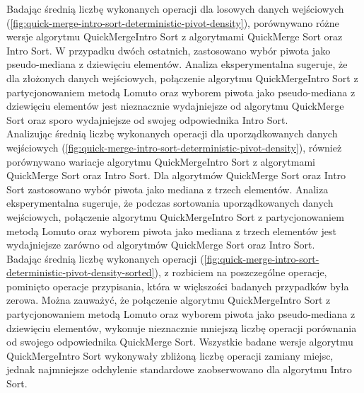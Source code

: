 Badając średnią liczbę wykonanych operacji dla losowych danych wejściowych (\ref{fig:quick-merge-intro-sort-deterministic-pivot-density}), porównywano różne wersje algorytmu QuickMergeIntro Sort z algorytmami QuickMerge Sort oraz Intro Sort. W przypadku dwóch ostatnich, zastosowano wybór piwota jako pseudo-mediana z dziewięciu elementów. Analiza eksperymentalna sugeruje, że dla złożonych danych wejściowych, połączenie algorytmu QuickMergeIntro Sort z partycjonowaniem metodą Lomuto oraz wyborem piwota jako pseudo-mediana z dziewięciu elementów jest nieznacznie wydajniejsze od algorytmu QuickMerge Sort oraz sporo wydajniejsze od swojeg odpowiednika Intro Sort.\\ 

Analizując średnią liczbę wykonanych operacji dla uporządkowanych danych wejściowych (\ref{fig:quick-merge-intro-sort-deterministic-pivot-density}), również porównywano wariacje algorytmu QuickMergeIntro Sort z algorytmami QuickMerge Sort oraz Intro Sort. Dla algorytmów QuickMerge Sort oraz Intro Sort zastosowano wybór piwota jako mediana z trzech elementów. Analiza eksperymentalna sugeruje, że podczas sortowania uporządkowanych danych wejściowych, połączenie algorytmu QuickMergeIntro Sort z partycjonowaniem metodą Lomuto oraz wyborem piwota jako mediana z trzech elementów jest wydajniejsze zarówno od algorytmów QuickMerge Sort oraz Intro Sort.\\

Badając średnią liczbę wykonanych operacji (\ref{fig:quick-merge-intro-sort-deterministic-pivot-density-sorted}), z rozbiciem na poszczególne operacje, pominięto operacje przypisania, która w większości badanych przypadków była zerowa.  Można zauważyć, że połączenie algorytmu QuickMergeIntro Sort z partycjonowaniem metodą Lomuto oraz wyborem piwota jako pseudo-mediana z dziewięciu elementów, wykonuje nieznacznie mniejszą liczbę operacji porównania od swojego odpowiednika QuickMerge Sort. Wszystkie badane wersje algorytmu QuickMergeIntro Sort wykonywały zbliżoną liczbę operacji zamiany miejsc, jednak najmniejsze odchylenie standardowe zaobserwowano dla algorytmu Intro Sort.\\

\begin{figure}[]
	\centering
	
	\caption[]{}
	\label{fig:quick-merge-intro-sort-deterministic-pivot-random-sorted}
\end{figure}

